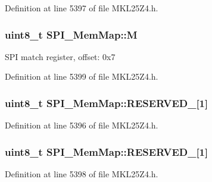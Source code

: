 Definition at line 5397 of file M\+K\+L25\+Z4.\+h.

\subsubsection[{\texorpdfstring{M}{M}}]{\setlength{\rightskip}{0pt plus 5cm}uint8\+\_\+t S\+P\+I\+\_\+\+Mem\+Map\+::M}\hypertarget{struct_s_p_i___mem_map_acd26c314a794ed500a27a4b6bc51eec9}{}\label{struct_s_p_i___mem_map_acd26c314a794ed500a27a4b6bc51eec9}
S\+PI match register, offset\+: 0x7 

Definition at line 5399 of file M\+K\+L25\+Z4.\+h.

\subsubsection[{\texorpdfstring{R\+E\+S\+E\+R\+V\+E\+D\+\_\+0}{RESERVED_0}}]{\setlength{\rightskip}{0pt plus 5cm}uint8\+\_\+t S\+P\+I\+\_\+\+Mem\+Map\+::\+R\+E\+S\+E\+R\+V\+E\+D\+\_\mbox{[}1\mbox{]}}\hypertarget{struct_s_p_i___mem_map_a389ec0465af8c44c5e4f4faaad940f8c}{}\label{struct_s_p_i___mem_map_a389ec0465af8c44c5e4f4faaad940f8c}


Definition at line 5396 of file M\+K\+L25\+Z4.\+h.

\subsubsection[{\texorpdfstring{R\+E\+S\+E\+R\+V\+E\+D\+\_\+1}{RESERVED_1}}]{\setlength{\rightskip}{0pt plus 5cm}uint8\+\_\+t S\+P\+I\+\_\+\+Mem\+Map\+::\+R\+E\+S\+E\+R\+V\+E\+D\+\_\mbox{[}1\mbox{]}}\hypertarget{struct_s_p_i___mem_map_ad5fafb348f6501bbb48ed41bd58f4aab}{}\label{struct_s_p_i___mem_map_ad5fafb348f6501bbb48ed41bd58f4aab}


Definition at line 5398 of file M\+K\+L25\+Z4.\+h.

